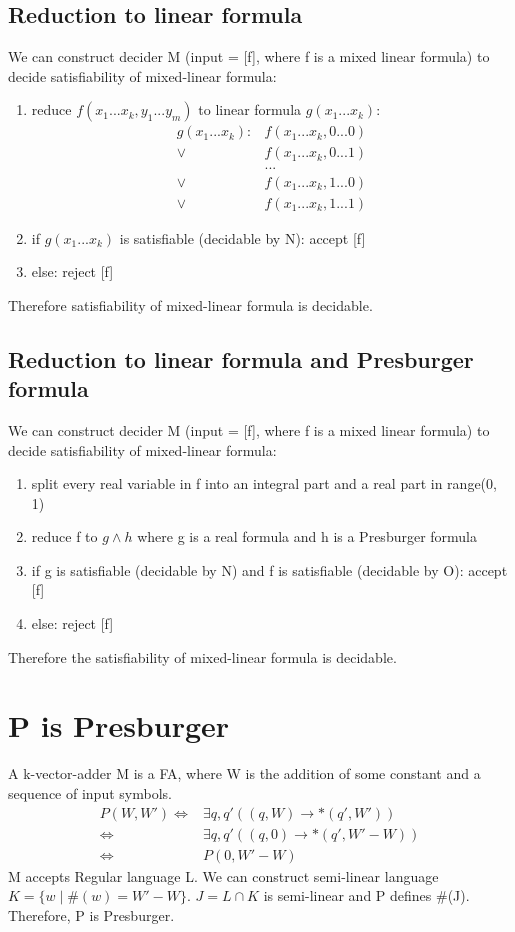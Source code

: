 \documentclass{article}
\begin{document}
\subsection{Reduction to linear formula}
We can construct decider M (input = [f], where f is a mixed linear formula) to 
decide satisfiability of mixed-linear formula:
\begin{enumerate}
	\item reduce $ f(x_1 ... x_k, y_1 ... y_m) $ to linear formula $ g(x_1 ... 
	x_k) $:
	\begin{align*}
		g(x_1 ... x_k):& f(x_1 ... x_k, 0 ... 0) \\
		 \lor& f(x_1 ... x_k, 0 ... 1) \\
		& ... \\
		\lor& f(x_1 ... x_k, 1 ... 0) \\
		\lor& f(x_1 ... x_k, 1 ... 1)
	\end{align*}
	\item if $ g(x_1 ... x_k) $ is satisfiable (decidable by N): accept [f]
	\item else: reject [f]
\end{enumerate}
Therefore satisfiability of mixed-linear formula is decidable.

\subsection{Reduction to linear formula and Presburger formula}
We can construct decider M (input = [f], where f is a mixed linear formula) to 
decide satisfiability of mixed-linear formula:
\begin{enumerate}
	\item split every real variable in f into an integral part and a real 
	part in range(0, 1)
	\item reduce f to $ g \land h $ where g is a real formula and h is a 
	Presburger formula
	\item if g is satisfiable (decidable by N) and f is satisfiable (decidable 
	by O): accept [f]
	\item else: reject [f]
\end{enumerate}
Therefore the satisfiability of mixed-linear formula is decidable.

\section{P is Presburger}
A k-vector-adder M is a FA, where W is the addition of some constant and a 
sequence of input symbols.
\begin{align*}
	P(W, W')
	\iff& \exists q, q' ((q, W) \rightarrow* (q', W'))\\
	\iff& \exists q, q' ((q, 0) \rightarrow* (q', W'-W))\\
	\iff& P(0, W' - W)
\end{align*}
M accepts Regular language L. We can construct semi-linear language $ K = \{w 
\mid \#(w) = W'-W\} $. $ J = L \cap K $ is semi-linear and P defines \#(J). 
Therefore, P is Presburger.
\end{document}
